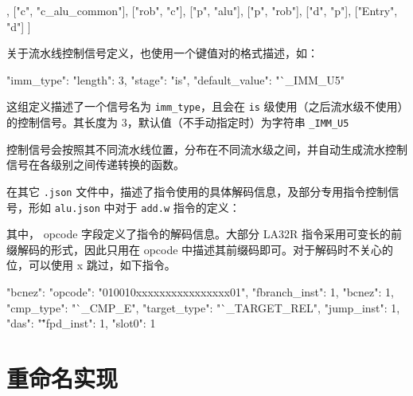 \begin{CodeBlock}[language=BookJSON]
[
        ["alu", "c_alu_common"],
        ["c", "c_alu_common"],
        ["rob", "c"],
        ["p", "alu"],
        ["p", "rob"],
        ["d", "p"],
        ["Entry", "d"]
]
\end{CodeBlock}

关于流水线控制信号定义，也使用一个键值对的格式描述，如：

\begin{CodeBlock}[language=BookJSON]
"imm_type": {
    "length": 3,
    "stage": "is",
    "default_value": "`_IMM_U5"
}
\end{CodeBlock}

这组定义描述了一个信号名为 \texttt{imm\_type}，且会在 \texttt{is} 级使用（之后流水级不使用）的控制信号。其长度为 3，默认值（不手动指定时）为字符串 \texttt{\textasciigrave{}\_IMM\_U5}

控制信号会按照其不同流水线位置，分布在不同流水级之间，并自动生成流水控制信号在各级别之间传递转换的函数。

在其它 \texttt{.json} 文件中，描述了指令使用的具体解码信息，及部分专用指令控制信号，形如 \texttt{alu.json} 中对于 \texttt{add.w} 指令的定义：


其中， opcode 字段定义了指令的解码信息。大部分 LA32R 指令采用可变长的前缀解码的形式，因此只用在 opcode 中描述其前缀码即可。对于解码时不关心的位，可以使用 x 跳过，如下指令。

\begin{CodeBlock}[language=BookJSON]
"bcnez": {
    "opcode": "010010xxxxxxxxxxxxxxxx01",
    "fbranch_inst": 1,
    "bcnez": 1,
    "cmp_type": "`_CMP_E",
    "target_type": "`_TARGET_REL",
    "jump_inst": 1,
    "das": "\"%
    "fpd_inst": 1,
    "slot0": 1
}
\end{CodeBlock}

\section{重命名实现}\label{sec:05-complex-cpu-004}

